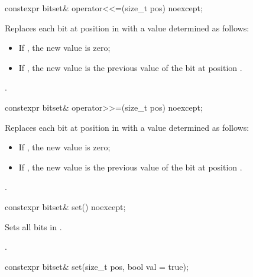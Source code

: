 %
\begin{itemdecl}
constexpr bitset& operator<<=(size_t pos) noexcept;
\end{itemdecl}

\begin{itemdescr}
\pnum
\effects
Replaces each bit at position  in
with a value determined as follows:

\begin{itemize}
\item
If , the new value is zero;
\item
If , the new value is the previous
value of the bit at position .
\end{itemize}

\pnum
\returns
{}.
\end{itemdescr}

%
\begin{itemdecl}
constexpr bitset& operator>>=(size_t pos) noexcept;
\end{itemdecl}

\begin{itemdescr}
\pnum
\effects
Replaces each bit at position  in
with a value determined as follows:

\begin{itemize}
\item
If , the new value is zero;
\item
If , the new value is the previous value of the bit at position .
\end{itemize}

\pnum
\returns
{}.
\end{itemdescr}

%
%
\begin{itemdecl}
constexpr bitset& set() noexcept;
\end{itemdecl}

\begin{itemdescr}
\pnum
\effects
Sets all bits in
.

\pnum
\returns
{}.
\end{itemdescr}

%
%
\begin{itemdecl}
constexpr bitset& set(size_t pos, bool val = true);
\end{itemdecl}

